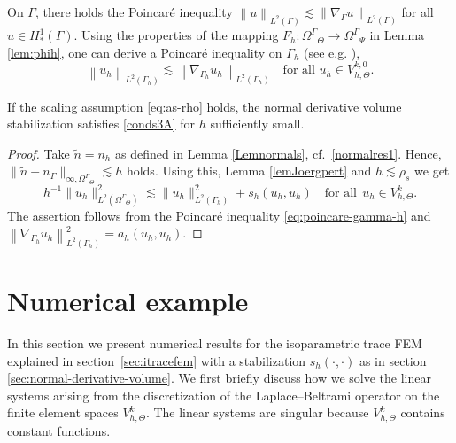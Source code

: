 \documentclass[final]{siamltex}
\begin{document}
On $\Gamma$, there holds the Poincar{\'e} inequality ${\left\lVert {u} \right\rVert}_{L^2(\Gamma)}\lesssim {\left\lVert {\nabla_\Gamma u} \right\rVert}_{L^2(\Gamma)}$ for all $u\in H^1_\ast(\Gamma)$. Using the properties of the mapping $F_h\colon {\Omega^{\Gamma}}_\Theta\to{\Omega^{\Gamma}}_\Psi$ in Lemma \ref{lem:phih}, one can derive a Poincar{\'e} inequality on $\Gamma_h$ (see e.g. \cite[Remark 5.3]{reusken2015}), 
\begin{equation}\label{eq:poincare-gamma-h}
  {\left\lVert {u_h} \right\rVert}_{L^2(\Gamma_h)}\lesssim {\left\lVert {\nabla_{\Gamma_h} u_h} \right\rVert}_{L^2(\Gamma_h)}\quad \text{for all } u_h \in {V_{h,\Theta}^{k,0}}.
\end{equation}

\begin{corollary}\label{coro:cond3A} If the scaling assumption \eqref{eq:as-rho} holds, the normal derivative volume stabilization satisfies \eqref{conds3A} for $h$ sufficiently small. 
\end{corollary}
\begin{proof} Take $\tilde n=n_h$ as defined in Lemma \ref{Lemnormals}, cf.~\eqref{normalres1}. Hence, $\|\tilde n - n_\Gamma\|_{\infty,{\Omega^{\Gamma}}_\Theta} \lesssim h$ holds. Using this, Lemma \ref{lemJoergpert} and $h\lesssim \rho_s$ we get
\[
  h^{-1} \| u_h\|_{L^2({\Omega^{\Gamma}}_\Theta)}^2 \lesssim \|u_h\|_{L^2(\Gamma_h)}^2 + s_h(u_h, u_h) \quad \text{for all}~~u_h\in {V_{h,\Theta}^k}.
\]
The assertion follows from the Poincar{\'e} inequality \eqref{eq:poincare-gamma-h} and ${\left\lVert {\nabla_{\Gamma_h} u_h} \right\rVert}_{L^2(\Gamma_h)}^2 = a_h(u_h,u_h)$.
\end{proof}

\section{Numerical example} \label{sec:numex}
In this section we present numerical results for the isoparametric trace FEM explained in section~\ref{sec:itracefem} with a stabilization $s_h(\cdot,\cdot)$ as in section \ref{sec:normal-derivative-volume}. 
We first briefly discuss how we solve the linear systems arising from the discretization of the Laplace--Beltrami operator on the finite element spaces ${V_{h,\Theta}^k}$. The linear systems are singular because ${V_{h,\Theta}^k}$ contains constant functions.
\end{document}
